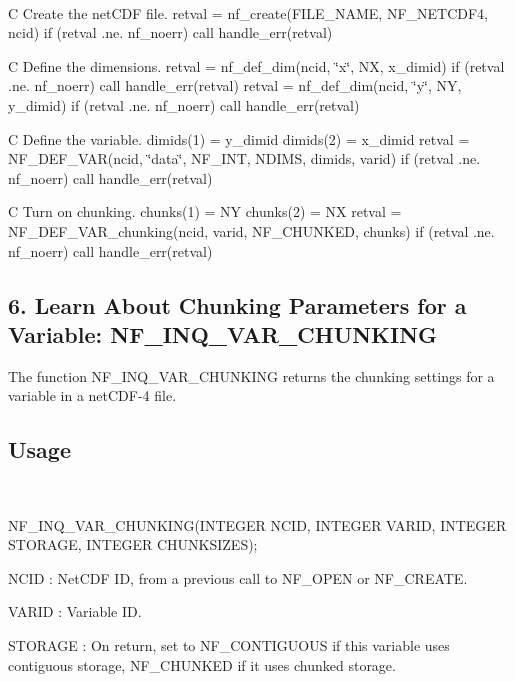  

C Create the net\+C\+DF file. retval = nf\+\_\+create(\+F\+I\+L\+E\+\_\+\+N\+A\+M\+E, N\+F\+\_\+\+N\+E\+T\+C\+D\+F4, ncid) if (retval .ne. nf\+\_\+noerr) call handle\+\_\+err(retval)

C Define the dimensions. retval = nf\+\_\+def\+\_\+dim(ncid, \char`\"{}x\char`\"{}, NX, x\+\_\+dimid) if (retval .ne. nf\+\_\+noerr) call handle\+\_\+err(retval) retval = nf\+\_\+def\+\_\+dim(ncid, \char`\"{}y\char`\"{}, NY, y\+\_\+dimid) if (retval .ne. nf\+\_\+noerr) call handle\+\_\+err(retval)

C Define the variable. dimids(1) = y\+\_\+dimid dimids(2) = x\+\_\+dimid retval = N\+F\+\_\+\+D\+E\+F\+\_\+\+V\+AR(ncid, \char`\"{}data\char`\"{}, N\+F\+\_\+\+I\+NT, N\+D\+I\+MS, dimids, varid) if (retval .ne. nf\+\_\+noerr) call handle\+\_\+err(retval)

C Turn on chunking. chunks(1) = NY chunks(2) = NX retval = N\+F\+\_\+\+D\+E\+F\+\_\+\+V\+A\+R\+\_\+chunking(ncid, varid, N\+F\+\_\+\+C\+H\+U\+N\+K\+E\+D, chunks) if (retval .ne. nf\+\_\+noerr) call handle\+\_\+err(retval)

\subsection*{6. Learn About Chunking Parameters for a Variable\+: {\ttfamily N\+F\+\_\+\+I\+N\+Q\+\_\+\+V\+A\+R\+\_\+\+C\+H\+U\+N\+K\+I\+NG} }

The function N\+F\+\_\+\+I\+N\+Q\+\_\+\+V\+A\+R\+\_\+\+C\+H\+U\+N\+K\+I\+NG returns the chunking settings for a variable in a net\+C\+D\+F-\/4 file.

\subsection*{Usage }

 

N\+F\+\_\+\+I\+N\+Q\+\_\+\+V\+A\+R\+\_\+\+C\+H\+U\+N\+K\+I\+N\+G(\+I\+N\+T\+E\+G\+E\+R N\+C\+I\+D, I\+N\+T\+E\+G\+E\+R V\+A\+R\+I\+D, I\+N\+T\+E\+G\+E\+R S\+T\+O\+R\+A\+G\+E, I\+N\+T\+E\+G\+E\+R C\+H\+U\+N\+K\+S\+I\+Z\+E\+S);

{\ttfamily N\+C\+ID} \+: Net\+C\+DF ID, from a previous call to N\+F\+\_\+\+O\+P\+EN or N\+F\+\_\+\+C\+R\+E\+A\+TE.

{\ttfamily V\+A\+R\+ID} \+: Variable ID.

{\ttfamily S\+T\+O\+R\+A\+GE} \+: On return, set to N\+F\+\_\+\+C\+O\+N\+T\+I\+G\+U\+O\+US if this variable uses contiguous storage, N\+F\+\_\+\+C\+H\+U\+N\+K\+ED if it uses chunked storage.

